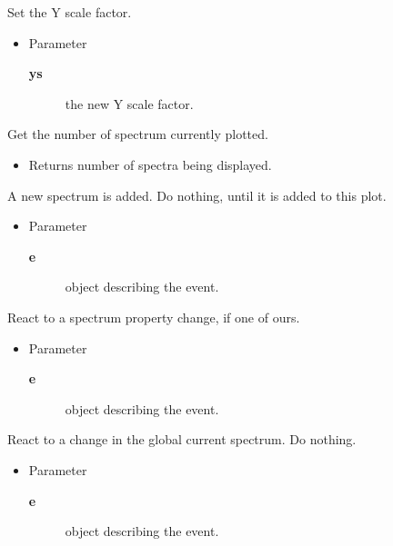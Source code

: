 \begin{desc}Set the Y scale factor.
\begin{itemize}
\item{Parameter
  \begin{description}
   \item[\textbf{ys}]{the new Y scale factor.}
  \end{description}}
\end{itemize}
\end{desc}

\begin{desc}Get the number of spectrum currently plotted.
\begin{itemize}
\item{Returns number of spectra being displayed. }
\end{itemize}
\end{desc}

\begin{desc}A new spectrum is added. Do nothing, until it is added to this
 plot.
\begin{itemize}
\item{Parameter
  \begin{description}
   \item[\textbf{e}]{object describing the event.}
  \end{description}}
\end{itemize}
\end{desc}

\begin{desc}React to a spectrum property change, if one of ours.
\begin{itemize}
\item{Parameter
  \begin{description}
   \item[\textbf{e}]{object describing the event.}
  \end{description}}
\end{itemize}
\end{desc}

\begin{desc}React to a change in the global current spectrum. Do nothing.
\begin{itemize}
\item{Parameter
  \begin{description}
   \item[\textbf{e}]{object describing the event.}
  \end{description}}
\end{itemize}
\end{desc}

